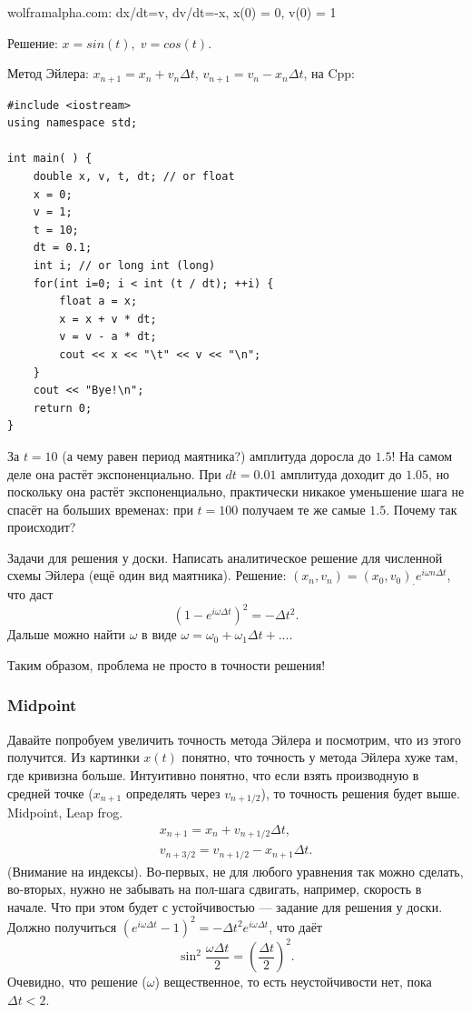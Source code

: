 \documentclass{book}
\begin{document}
wolframalpha.com: dx/dt=v, dv/dt=-x, x(0) = 0, v(0) = 1

Решение: $x = sin(t), \; v = cos(t)$.

Метод Эйлера: $x_{n+1} = x_n + v_n \Delta t$, $v_{n+1} = v_n - x_n \Delta t$, на Cpp:

\begin{verbatim}
#include <iostream> 
using namespace std;

int main( ) { 
    double x, v, t, dt; // or float
    x = 0; 
    v = 1; 
    t = 10; 
    dt = 0.1; 
    int i; // or long int (long)
    for(int i=0; i < int (t / dt); ++i) { 
        float a = x; 
        x = x + v * dt; 
        v = v - a * dt; 
        cout << x << "\t" << v << "\n";
    } 
    cout << "Bye!\n";
    return 0; 
}
\end{verbatim}
За $t = 10$ (а чему равен период маятника?) амплитуда доросла до $1.5$! На самом деле она растёт
экспоненциально. При $dt = 0.01$ амплитуда доходит до $1.05$, но поскольку она растёт
экспоненциально, практически никакое уменьшение шага не спасёт на больших временах: при $t = 100$
получаем те же самые $1.5$. Почему так происходит?

Задачи для решения у доски. Написать аналитическое решение для численной схемы Эйлера (ещё один вид
маятника). Решение: $(x_n, v_n) = (x_0, v_0)_\cdot e^{i \omega n \Delta t}$, что даст
\begin{equation}
    (1 - e^{i \omega \Delta t})^2 = -\Delta t^2.
\end{equation}
Дальше можно найти $\omega$ в виде $\omega = \omega_0 + \omega_1 \Delta t + ...$.

Таким образом, проблема не просто в точности решения!

\subsubsection{Midpoint}

Давайте попробуем увеличить точность метода Эйлера и посмотрим, что из этого получится. Из картинки
$x(t)$ понятно, что точность у метода Эйлера хуже там, где кривизна больше. Интуитивно понятно, что
если взять производную в средней точке ($x_{n+1}$ определять через $v_{n + 1/2}$), то точность
решения будет выше. Midpoint, Leap frog.
\begin{eqnarray}
    x_{n + 1} = x_n + v_{n + 1/2} \Delta t, \\
    v_{n + 3/2} = v_{n + 1/2} - x_{n + 1} \Delta t.
\end{eqnarray}
(Внимание на индексы). Во-первых, не для любого уравнения так можно сделать, во-вторых, нужно не
забывать на пол-шага сдвигать, например, скорость в начале. Что при этом будет с устойчивостью ---
задание для решения у доски. Должно получиться $(e^{i \omega \Delta t} - 1)^2 = -\Delta t^2 e^{i
\omega \Delta t}$, что даёт
\begin{equation}
    \sin^2 \frac{\omega \Delta t}{2} = \left( \frac{\Delta t}{2} \right)^2.
\end{equation}
Очевидно, что решение ($\omega$) вещественное, то есть неустойчивости нет, пока $\Delta t < 2$.
\end{document}
